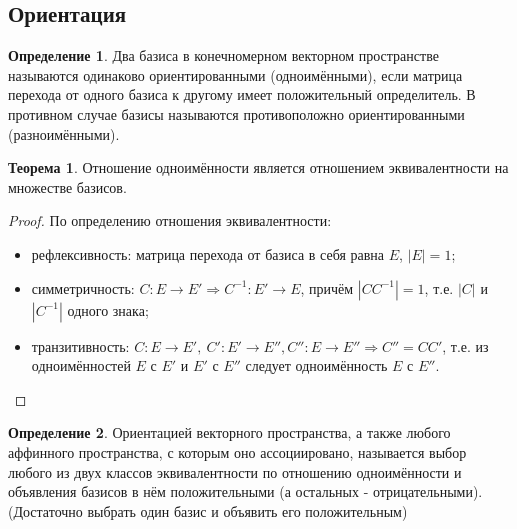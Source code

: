 \documentclass[a4paper, 12pt]{article}
\theoremstyle{definition}
\newtheorem*{definition}{Определение}
\newtheorem*{theorem}{Теорема}
\begin{document}
	\subsection{Ориентация}
	\begin{definition}
		Два базиса в конечномерном векторном пространстве называются одинаково ориентированными (одноимёнными), если матрица перехода от одного базиса к другому имеет положительный определитель. В противном случае базисы называются противоположно ориентированными (разноимёнными).
	\end{definition}
	\begin{theorem}
		Отношение одноимённости является отношением эквивалентности на множестве базисов.
	\end{theorem}
	\begin{proof}
		По определению отношения эквивалентности:
		\begin{itemize}
			\item рефлексивность: матрица перехода от базиса в себя равна $E$, $|E| = 1$;
			\item симметричность: $C: E \rightarrow E' \Rightarrow C^{-1}: E' \rightarrow E$, причём $|C C^{-1}| = 1$, т.е. $|C|$ и $|C^{-1}|$ одного знака;
			\item транзитивность: $C: E \rightarrow E', \ C': E' \rightarrow E'', C'': E \rightarrow E'' \Rightarrow C'' = CC'$, т.е. из одноимённостей $E$ с $E'$ и $E'$ с $E''$ следует одноимённость $E$ с $E''$.
		\end{itemize}
	\end{proof}
	\begin{definition}
		Ориентацией векторного пространства, а также любого аффинного пространства, с которым оно ассоциировано, называется выбор любого из двух классов эквивалентности по отношению одноимённости и объявления базисов в нём положительными (а остальных - отрицательными).\\ 
		(Достаточно выбрать один базис и объявить его положительным)
	\end{definition}
\end{document}

